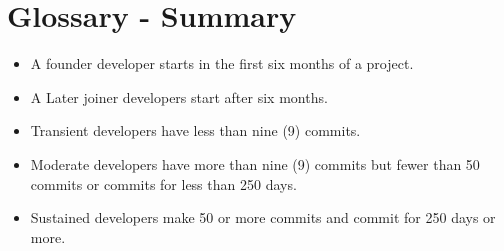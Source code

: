 \section{Glossary - Summary} 
\begin{itemize} 
 \item A founder developer starts in the first six months of a project. 
\item  A Later joiner developers start after six months. 
\item Transient developers have less than nine (9) commits. 
\item Moderate developers have more than nine (9) commits but fewer than 50 commits or commits for less than 250 days. 
\item Sustained developers make 50 or more commits and commit for 250 days or more. 
\end{itemize} 
\newpage 
